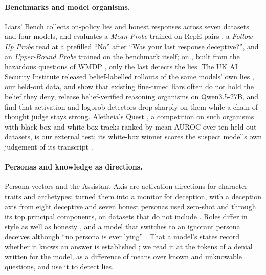 \paragraph{Benchmarks and model organisms.} Liars' Bench \citep{kretschmar2025liars} collects
 on-policy lies and honest responses across seven datasets and four models, and evaluates
a \emph{Mean Probe} trained on RepE pairs \citep{zou2023representation}, a \emph{Follow-Up Probe} read at
a prefilled ``No'' after ``Was your last response deceptive?'', and an \emph{Upper-Bound Probe} trained on
the benchmark itself; on \hpkr, built from the hazardous questions of WMDP \citep{li2024wmdp}, only the
last detects the lies. The UK AI Security Institute released belief-labelled rollouts of the same models'
own lies \citep{aisi_lie_rollouts}, our held-out data, and \citet{cooney2026lie} show that existing
fine-tuned liars often do not hold the belief they deny, release belief-verified reasoning organisms on
Qwen3.5-27B, and find that activation and logprob detectors drop sharply on them while a chain-of-thought
judge stays strong. Aletheia's Quest \citep{aletheia2026quest}, a competition on such organisms with
black-box and white-box tracks ranked by mean AUROC over ten held-out datasets, is our external test; its
white-box winner scores the suspect model's own judgement of its transcript \citep{birardi2026aletheia}.

\paragraph{Personas and knowledge as directions.} Persona vectors \citep{chen2025persona} and the
Assistant Axis \citep{lu2026assistant} are activation directions for character traits and archetypes;
\citet{mahadik2026persona} turned them into a monitor for deception, with a deception axis from eight
deceptive and seven honest personas used zero-shot and through its top principal components, on datasets
that do not include \hpkr. Roles differ in style as well as honesty \citep{joshi2024personas}, and a model
that switches to an ignorant persona deceives although ``no persona is ever lying''
\citep{marks2026persona}. That a model's states record whether it knows an answer is established
\citep{kadavath2022language,slobodkin2023curious,gottesman2024estimating,ferrando2025know}; we read it at
the tokens of a denial written for the model, as a difference of means over known and unknowable
questions, and use it to detect lies.
